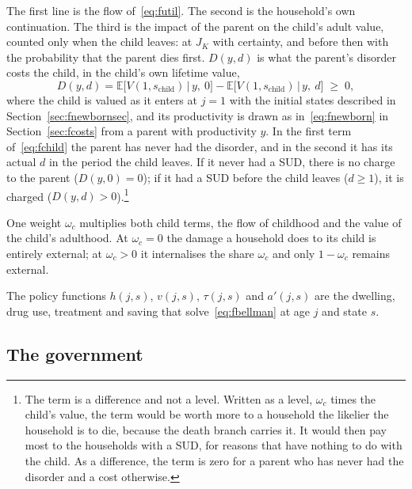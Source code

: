 \documentclass[10pt]{article}
\begin{document}
The first line is the flow of~\eqref{eq:futil}. The second is the household's own
continuation. The third is the impact of the parent on the child's adult value, counted only when the child leaves: at
$J_K$ with certainty, and before then with the probability that the parent dies first.
$D(y,d)$ is what the parent's disorder costs the child, in the child's own lifetime value,
\begin{equation}\label{eq:fchild}
D(y,d)=\mathbb{E}\big[V(1,s_{\text{child}})\,\big|\,y,\ 0\big]
-\mathbb{E}\big[V(1,s_{\text{child}})\,\big|\,y,\ d\big]\;\ge\;0,
\end{equation}
where the child is valued as it enters at $j=1$ with the initial states described in Section~\ref{sec:fnewbornsec}, and its productivity is drawn as
in~\eqref{eq:fnewborn} in Section~\ref{sec:fcosts} from a parent with productivity $y$. In the first term of~\eqref{eq:fchild} the parent has never had the disorder, and in the second it has its actual $d$ in the period the child leaves. If it never had a SUD, there is no charge to the parent ($D(y,0)=0$); if it had a SUD before the child leaves ($d\ge1$), it is charged ($D(y,d)>0$).\footnote{The term is a difference and not a level. Written as a level, $\omega_c$ times the child's value, the term would be worth more to a household the likelier the household is to die, because the death branch carries it. It would then pay most to the households with a SUD, for reasons that have nothing to do with the child. As a difference, the term is zero for a parent who has never had the disorder and a cost otherwise.}

One weight $\omega_c$ multiplies both child terms, the flow of childhood and the value
of the child's adulthood. At $\omega_c=0$ the damage a household does to its child is entirely
external; at $\omega_c>0$ it internalises the share $\omega_c$ and only $1-\omega_c$
remains external.

The policy functions $h(j,s)$, $v(j,s)$, $\tau(j,s)$ and $a'(j,s)$ are the dwelling, drug use, treatment and saving that solve~\eqref{eq:fbellman} at age $j$ and state $s$.

\subsection{The government}\label{sec:fgovt}
\end{document}
